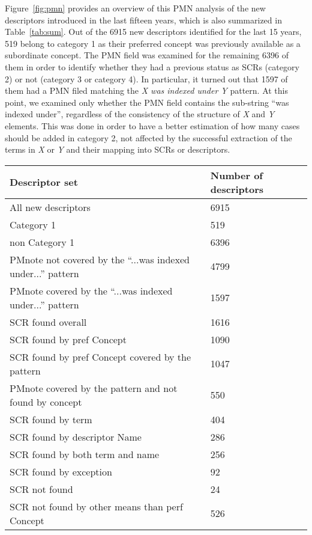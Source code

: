 Figure~\ref{fig:pmn} provides an overview of this PMN analysis of the new descriptors introduced in the last fifteen years, which is also summarized in Table~\ref{tab:sum}. 
Out of the 6915 new descriptors identified for the last 15 years, 519 belong to category 1 as their preferred concept was previously available as a subordinate concept. The PMN field was examined for the remaining 6396 of them in order to identify whether they had a previous status as SCRs (category 2) or not (category 3 or category 4). In particular, it turned out that 1597 of them had a PMN filed matching the \textit{X was indexed under Y} pattern. At this point, we examined only whether the PMN field contains the sub-string ``was indexed under'', regardless of the consistency of the structure of \textit{X} and \textit{Y} elements. This was done in order to have a better estimation of how many cases should be added in category 2, not affected by the successful extraction of the terms in \textit{X} or \textit{Y} and their mapping into SCRs or descriptors.

\begin{table*}
\caption{Sets of new descriptors introduced in the last fifteen years in the context of harvesting their Public MeSH Note field.}
\label{tab:sum}       %
\centering
\begin{tabular}{ll}
\textbf{Descriptor set}   & \textbf{Number of descriptors}  		\\
\hline
All new descriptors   & 6915 		\\
Category 1    & 519  		\\
non Category 1    & 6396		\\
PMnote not covered by the ``...was indexed under...'' pattern  & 4799		\\
PMnote covered by the ``...was indexed under...'' pattern & 1597		\\
SCR found overall & 1616		\\
SCR found by pref Concept & 1090 \\
SCR found by pref Concept covered by the pattern & 1047 \\
PMnote covered by the pattern and not found by concept & 550 \\
SCR found by term & 404 \\
SCR found by descriptor Name & 286 \\
SCR found by both term and name & 256 \\
SCR found by exception & 92 \\
SCR not found  & 24 \\
SCR not found by other means than perf Concept & 526 \\
\end{tabular}
\end{table*}

